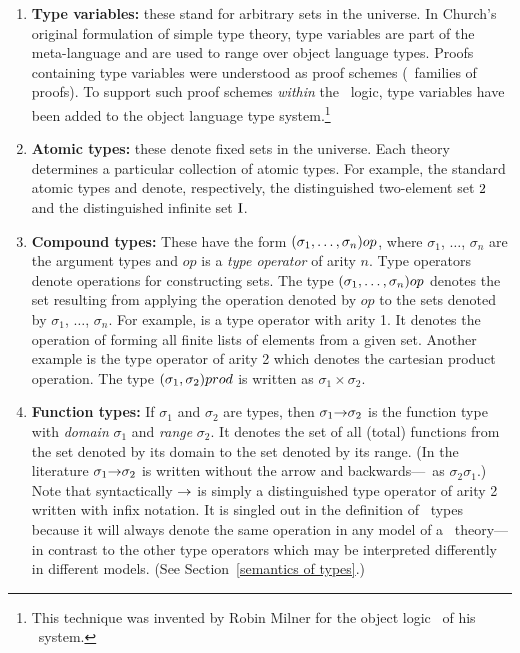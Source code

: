 \begin{enumerate}

\item {\bf Type variables:} these stand for arbitrary
sets in the universe.  In Church's original formulation of simple type
theory, type variables are part of the meta-language and are used to
range over object language types.  Proofs containing type variables
were understood as proof schemes (\ie\ families of proofs). To support
such proof schemes {\it within} the \HOL\ logic, type variables have
been added to the object language type system.\footnote{This technique
was invented by Robin Milner for the object logic \PPL\ of his \LCF\
system.}

\item {\bf Atomic types:} these denote fixed sets in the universe. Each
theory determines a particular collection of atomic types.  For
example, the standard atomic types  and  denote,
respectively, the distinguished two-element set $\mbox{\rm 2}$ and the
distinguished infinite set $\mbox{\rm I}$.

\item {\bf Compound types:} These have the
form $(\sigma_1,\ldots,\sigma_n){\sl op}$, where $\sigma_1$, $\dots$,
$\sigma_n$ are the argument types and $op$ is a {\it type operator\/}
of arity $n$.  Type operators denote operations for constructing sets.
The type $(\sigma_1,\ldots,\sigma_n){\sl op}$ denotes the set resulting
from applying the operation denoted by $op$ to the sets denoted by
$\sigma_1$, $\dots$, $\sigma_n$.  For example,
 is a type operator with arity 1.  It denotes the operation
of forming all finite lists of elements from a given set.  Another
example is the type operator \ty{prod} of arity 2 which denotes the
cartesian product operation.  The type $(\sigma_1,\sigma_2){\sl prod}$
is written as $\sigma_1\times\sigma_2$.

\item {\bf Function types:} If $\sigma_1$
and $\sigma_2$ are types, then $\sigma_1{\to}\sigma_2$ is the function
type with {\it domain\/} $\sigma_1$ and {\it range} $\sigma_2$. It
denotes the set of all (total) functions from the set denoted by its
domain to the set denoted by its range. (In the literature
$\sigma_1{\to}\sigma_2$ is written without the arrow and
backwards---\ie\ as $\sigma_2\sigma_1$.) Note that syntactically
${\to}$ is simply a distinguished type operator of arity 2 written with
infix notation. It is singled out in the definition of \HOL\ types
because it will always denote the same operation in any
model of a \HOL\ theory---in contrast to the other type operators which
may be interpreted differently in different models. (See
Section~\ref{semantics of types}.)


\end{enumerate}

